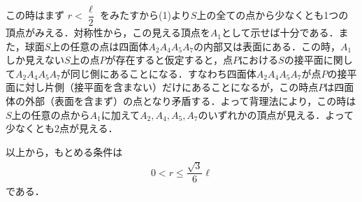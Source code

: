 \documentclass[../../main.tex]{subfiles}
\begin{document}
この時はまず $r < \dfrac{\ell}{2}$ をみたすから(1)より$S$上の全ての点から少なくとも1つの頂点がみえる．対称性から，この見える頂点を$A_1$として示せば十分である．また，球面$S$上の任意の点は四面体$A_2A_4A_5A_7$の内部又は表面にある．この時，$A_1$しか見えない$S$上の点$P$が存在すると仮定すると，点$P$における$S$の接平面に関して$A_2A_4A_5A_7$が同じ側にあることになる．すなわち四面体$A_2A_4A_5A_7$が点$P$の接平面に対し片側（接平面を含まない）だけにあることになるが，この時点$P$は四面体の外部（表面を含まず）の点となり矛盾する．よって背理法により，この時は$S$上の任意の点から$A_1$に加えて$A_2,A_4,A_5,A_7$のいずれかの頂点が見える．よって少なくとも$2$点が見える．
\casesend

以上から，もとめる条件は
\begin{align}
  0 < r \le \dfrac{\sqrt{3}}{6}\ell
\end{align}
である．
\end{document}
